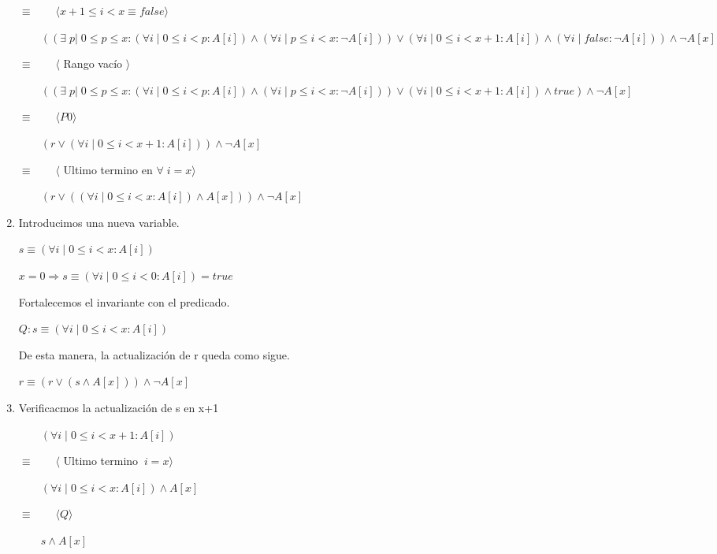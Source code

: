 \documentclass[hidelinks]{article}
\begin{document}
\begin{enumerate}
	      $\equiv  \qquad \langle x+1 \leq i < x \equiv false \rangle$ \par
	      $\qquad ((\exists \; p| \; 0 \leq p \leq x : (\forall i \;|\; 0 \leq i < p:A[i]) \land (\forall i \;|\; p \leq i < x: \neg A[i])) \lor (\forall i \;|\; 0 \leq i < x+1:A[i]) \land (\forall i \;|\; false: \neg A[i])) \land \neg A[x]$ \par
	      $\equiv  \qquad \langle$ Rango vacío  $ \rangle$ \par
	      $\qquad ((\exists \; p| \; 0 \leq p \leq x : (\forall i \;|\; 0 \leq i < p:A[i]) \land (\forall i \;|\; p \leq i < x: \neg A[i])) \lor (\forall i \;|\; 0 \leq i < x+1:A[i]) \land true) \land \neg A[x]$ \par
	      $\equiv  \qquad \langle P0 \rangle$ \par
	      $\qquad (r \lor (\forall i \;|\; 0 \leq i < x+1:A[i])) \land \neg A[x]$ \par
	      $\equiv  \qquad \langle$ Ultimo termino en  $\forall \; i=x \rangle$ \par
	      $\qquad (r \lor ((\forall i \;|\; 0 \leq i < x:A[i]) \land A[x])) \land \neg A[x]$ \par

	\item Introducimos una nueva variable. \par
	      $s \equiv (\forall i \;|\; 0 \leq i < x:A[i])$ \par
	      $x=0 \Rightarrow s \equiv (\forall i \;|\; 0 \leq i < 0:A[i])=true$ \par

	      Fortalecemos el invariante con el predicado.

	      \begin{center}
		      $Q: s \equiv (\forall i \;|\; 0 \leq i < x:A[i])$ \par
	      \end{center}

	      De esta manera, la actualización de r queda como sigue. \par

	      \begin{center}
		      $r \equiv (r \lor (s \land A[x])) \land \neg A[x]$ \par
	      \end{center}

	\item Verificacmos la actualización de s en x+1 \par
	      $\qquad (\forall i \;|\; 0 \leq i < x+1:A[i])$ \par
	      $\equiv  \qquad \langle$ Ultimo termino   $\ i=x \rangle$ \par
	      $\qquad (\forall i \;|\; 0 \leq i < x:A[i]) \land A[x]$ \par
	      $\equiv  \qquad \langle Q \rangle$ \par
	      $\qquad s \land A[x]$ \par


\end{enumerate}
\end{document}
